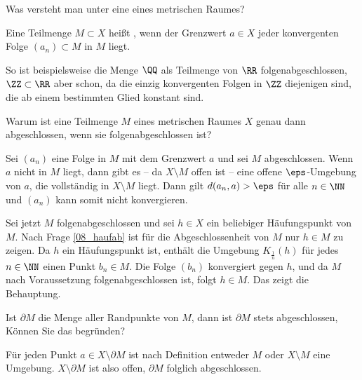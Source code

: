 \begin{frage}
  Was versteht man unter eine  
  eines metrischen Raumes?
\end{frage}

\begin{antwort}
  Eine Teilmenge $M\subset X$ heißt , wenn 
  der Grenzwert $a\in X$ jeder konvergenten Folge $(a_n) \subset M$ 
  in $M$ liegt.
  
  So ist beispielsweise die Menge $\QQ$ als Teilmenge von $\RR$ 
   folgenabgeschlossen, $\ZZ\subset \RR$ 
  aber schon, da die einzig konvergenten Folgen in $\ZZ$ diejenigen sind, die 
  ab einem bestimmten Glied konstant sind.
  \AntEnd
\end{antwort}

\begin{frage}%
  Warum ist eine Teilmenge $M$ eines metrischen Raumes 
  $X$ genau dann abgeschlossen, wenn sie folgenabgeschlossen ist?
\end{frage}

\begin{antwort}
  Sei $(a_n)$ eine Folge in $M$ mit dem Grenzwert $a$ und sei $M$ 
  abgeschlossen. Wenn $a$ nicht in $M$ liegt, dann gibt es -- da 
  $X \setminus M$ offen ist -- eine offene 
  $\eps$-Umgebung von $a$, die vollständig in 
  $X\setminus M$ liegt. Dann gilt 
  $d(a_n,a)>\eps$ für alle $n\in \NN$ und $(a_n)$ 
  kann somit nicht konvergieren.

  Sei jetzt $M$ folgenabgeschlossen und sei $h\in X$ ein beliebiger  
  Häufungspunkt von $M$. Nach Frage \ref{08_haufab} ist für die 
  Abgeschlossenheit von $M$ nur $h\in M$ zu zeigen. Da $h$ 
  ein Häufungspunkt ist, enthält die Umgebung 
  $K_{\frac{1}{n}}(h)$ für jedes $n\in \NN$ einen Punkt $b_n\in M$. 
  Die Folge $(b_n)$ konvergiert gegen $h$, und da $M$ nach Voraussetzung 
  folgenabgeschlossen ist, folgt $h\in M$. Das zeigt die Behauptung.
  \AntEnd   
\end{antwort}

\begin{frage}
  Ist $\partial M $ die Menge aller Randpunkte von $M$, dann ist 
  $\partial M$ stets abgeschlossen, Können Sie das begründen?
\end{frage}

\begin{antwort}
  Für jeden Punkt $a\in X\setminus \partial M$ ist nach Definition entweder 
  $M$ oder $X\setminus M$ eine Umgebung. $X\setminus \partial M$ ist also 
  offen, $\partial M$ folglich abgeschlossen.\AntEnd
\end{antwort}

